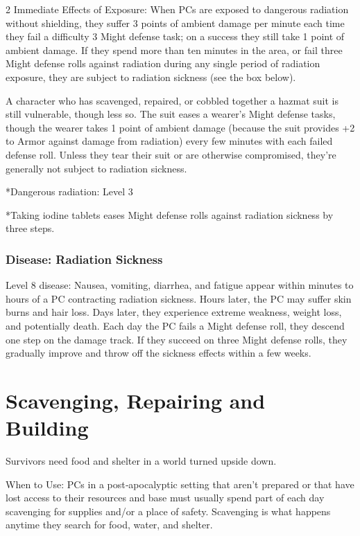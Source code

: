 \begin{multicols}{2}
Immediate Effects of Exposure: When PCs are exposed to dangerous radiation without shielding, they suffer 3 points of ambient damage per minute each time they fail a difficulty 3 Might defense task; on a success  they still take 1 point of ambient damage. If they spend more than ten minutes in the area, or fail three Might defense rolls against radiation during any single period of radiation exposure, they are subject to radiation sickness (see the box below). 

A character who has scavenged, repaired, or cobbled together a hazmat suit is still vulnerable, though less so. The suit eases a wearer’s Might defense tasks, though the wearer takes 1 point of ambient damage (because the suit provides +2 to Armor against damage from radiation) every few minutes with each failed defense roll. Unless they tear their suit or are otherwise compromised, they’re generally not subject to radiation sickness.

*Dangerous radiation: Level 3

*Taking iodine tablets eases Might defense rolls against radiation sickness by three steps. 

\subsubsection{Disease: Radiation Sickness}

Level 8 disease: Nausea, vomiting, diarrhea, and fatigue appear within minutes to hours of a PC contracting radiation sickness. Hours later, the PC may suffer skin burns and hair loss. Days later, they experience extreme weakness, weight loss, and potentially death.
Each day the PC fails a Might defense roll, they descend one step on the damage track. If they succeed on three Might defense rolls, they gradually improve and throw off the sickness effects within a few weeks.

\section{Scavenging, Repairing and Building}

Survivors need food and shelter in a world turned upside down. 

When to Use: PCs in a post‑apocalyptic setting that aren’t prepared or that have lost access to their resources and base must usually spend part of each day scavenging for supplies and/or a place of safety. Scavenging is what happens anytime they search for food, water, and shelter. 


\end{multicols}
